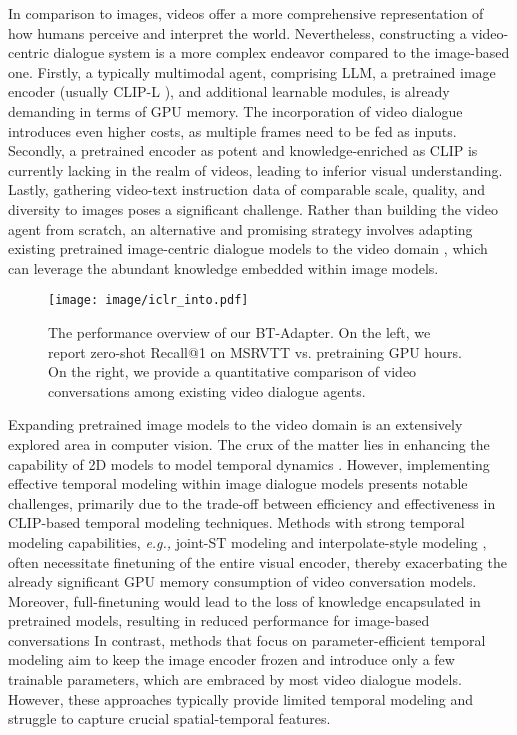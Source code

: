 \documentclass{article} \usepackage{iclr2024_conference,times}
\begin{document}
In comparison to images, videos offer a more comprehensive representation of how humans perceive and interpret the world. Nevertheless, constructing a video-centric dialogue system is a more complex endeavor compared to the image-based one. Firstly, a typically multimodal agent, comprising LLM, a pretrained image encoder (usually CLIP-L \citep{radford2021learning}), and additional learnable modules, is already demanding in terms of GPU memory. The incorporation of video dialogue introduces even higher costs, as multiple frames need to be fed as inputs. Secondly, a pretrained encoder as potent and knowledge-enriched as CLIP is currently lacking in the realm of videos, leading to inferior visual understanding. Lastly, gathering video-text instruction data of comparable scale, quality, and diversity to images poses a significant challenge. Rather than building the video agent from scratch, an alternative and promising strategy involves adapting existing pretrained image-centric dialogue models to the video domain \citep{li2023videochat, maaz2023video, zhang2023video, luo2023valley}, which can leverage the abundant knowledge embedded within image models. 

\begin{figure*}[t] 
    \setlength{\abovecaptionskip}{-0.01 cm}
\centering
    \texttt{[image: image/iclr\_into.pdf]} 
    \caption{The performance overview of our BT-Adapter. On the left, we report zero-shot Recall@1 on MSRVTT \citep{xu2016msr} vs. pretraining GPU hours. On the right, we provide a quantitative comparison of video conversations among existing video dialogue agents.}
    \label{image_intro}
    \vspace{-2em}
  \end{figure*}



Expanding pretrained image models to the video domain is an extensively explored area in computer vision. The crux of the matter lies in enhancing the capability of 2D models to model temporal dynamics \citep{bertasius2021space, carreira2017quo, tran2015learning}. 
However, implementing effective temporal modeling within image dialogue models presents notable challenges, primarily due to the trade-off between efficiency and effectiveness in CLIP-based temporal modeling techniques. Methods with strong temporal modeling capabilities, \textit{e.g.,} joint-ST modeling \citep{bertasius2021space, wang2022internvideo, li2023unmasked, xue2022clip} and interpolate-style modeling \citep{ni2022expanding, pan2022st}, often necessitate finetuning of the entire visual encoder, thereby exacerbating the already significant GPU memory consumption of video conversation models. Moreover, full-finetuning would lead to the loss of knowledge encapsulated in pretrained models, resulting in reduced performance for image-based conversations
In contrast, methods that focus on parameter-efficient temporal modeling aim to keep the image encoder frozen and introduce only a few trainable parameters, which are embraced by most video dialogue models. However, these approaches typically provide limited temporal modeling and struggle to capture crucial spatial-temporal features.
\end{document}
